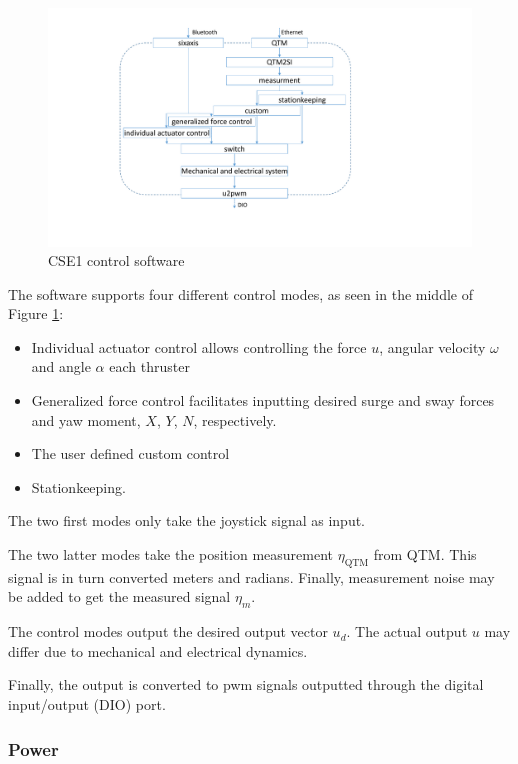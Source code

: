 \documentclass[a4paper,twoside,english]{report}
\begin{document}
\begin{figure}
\begin{centering}
\includegraphics[height=0.6\textwidth]{fig/CSE1_ctrl_software.pdf}
\par\end{centering}
\caption{\label{fig: CSE1 software}CSE1 control software}
\end{figure}

The software supports four different control modes, as seen in the
middle of Figure \ref{fig: CSE1 software}:
\begin{itemize}
\item Individual actuator control allows controlling the force $u$, angular
velocity $\omega$ and angle $\alpha$ each thruster
\item Generalized force control facilitates inputting desired surge and
sway forces and yaw moment, $X$, $Y$, $N$, respectively.
\item The user defined custom control
\item Stationkeeping.
\end{itemize}
The two first modes only take the joystick signal as input.

The two latter modes take the position measurement $\eta_{\text{QTM}}$
from QTM. This signal is in turn converted meters and radians. Finally,
measurement noise may be added to get the measured signal $\eta_{m}$.

The control modes output the desired output vector $u_{d}$. The actual
output $u$ may differ due to mechanical and electrical dynamics.

Finally, the output is converted to pwm signals outputted through
the digital input/output (DIO) port.

\subsubsection{Power}
\end{document}
